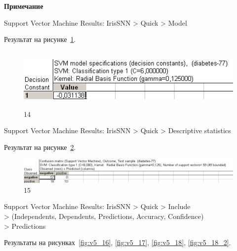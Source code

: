 \newpage

\begin{center}
  \textbf{Примечание}
\end{center}

Support Vector Machine Results: IrisSNN > Quick > Model

Результат на рисунке~\ref{fig:v5_14}.

\begin{figure}[!h]
  \centering

  \includegraphics[height=3cm]
  {inc/v5_14.PNG}

  \caption{14}

  \label{fig:v5_14}
\end{figure}

Support Vector Machine Results: IrisSNN > Quick > Descriptive statistics

Результат на рисунке~\ref{fig:v5_15}.

\begin{figure}[!h]
  \centering

  \includegraphics[width=18cm]
  {inc/v5_15.PNG}

  \caption{15}

  \label{fig:v5_15}
\end{figure}

Support Vector Machine Results: IrisSNN > Quick > Include \\
> (Independents, Dependents, Predictions, Accuracy, Confidence) \\
> Predictions

Результаты на рисунках~\ref{fig:v5_16}, \ref{fig:v5_17}, \ref{fig:v5_18}, \ref{fig:v5_18_2}.

